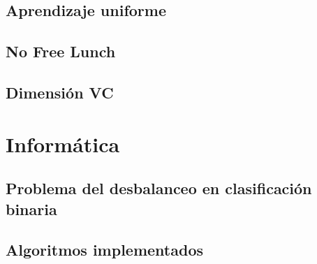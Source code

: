\documentclass[dottedtoc, headinclude, footinclude=true]{scrreprt}
\begin{document}
  \chapter{Aprendizaje uniforme}
    
  \chapter{No Free Lunch}
    
  \chapter{Dimensión VC}
    
  
\part{Informática}
  \chapter{Problema del desbalanceo en clasificación binaria}
    
  \chapter{Algoritmos implementados}
    
    
    
    


\end{document}
